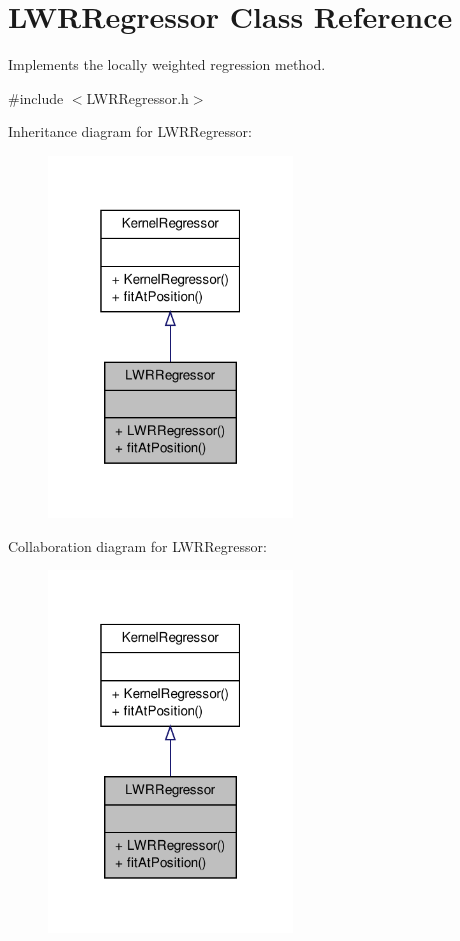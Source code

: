\hypertarget{classLWRRegressor}{\section{\-L\-W\-R\-Regressor \-Class \-Reference}
\label{classLWRRegressor}
}


\-Implements the locally weighted regression method.  




{\ttfamily \#include $<$\-L\-W\-R\-Regressor.\-h$>$}



\-Inheritance diagram for \-L\-W\-R\-Regressor\-:\nopagebreak
\begin{figure}[H]
\begin{center}
\leavevmode
\includegraphics[width=184pt]{classLWRRegressor__inherit__graph}
\end{center}
\end{figure}


\-Collaboration diagram for \-L\-W\-R\-Regressor\-:\nopagebreak
\begin{figure}[H]
\begin{center}
\leavevmode
\includegraphics[width=184pt]{classLWRRegressor__coll__graph}
\end{center}
\end{figure}
